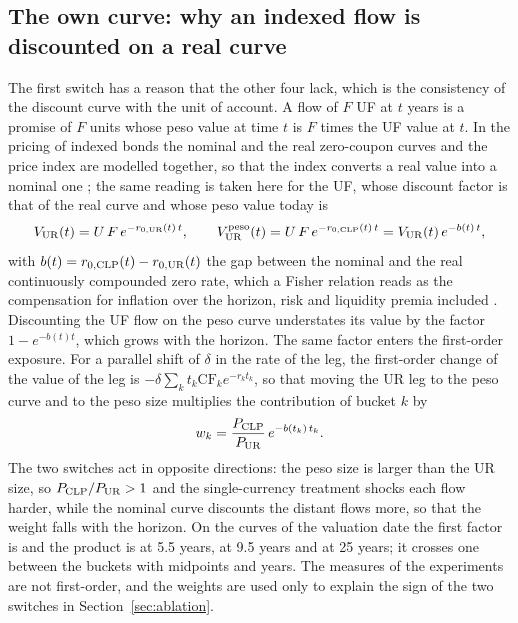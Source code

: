 \subsection{The own curve: why an indexed flow is discounted on a real curve}
\label{sec:method-curve}

The first switch has a reason that the other four lack, which is the consistency of the discount curve with the unit of account. A flow of $F$ UF at $t$ years is a promise of $F$ units whose peso value at time $t$ is $F$ times the UF value at $t$. In the pricing of indexed bonds the nominal and the real zero-coupon curves and the price index are modelled together, so that the index converts a real value into a nominal one \citep{Jarrow2003}; the same reading is taken here for the UF, whose discount factor is that of the real curve and whose peso value today is
\begin{equation}
V_{\mathrm{UR}}(t)=U\,F\,e^{-r_{0,\mathrm{UR}}(t)\,t},\qquad V_{\mathrm{UR}}^{\mathrm{peso}}(t)=U\,F\,e^{-r_{0,\mathrm{CLP}}(t)\,t}=V_{\mathrm{UR}}(t)\,e^{-b(t)\,t},
\label{eq:fisher}
\end{equation}
with $b(t)=r_{0,\mathrm{CLP}}(t)-r_{0,\mathrm{UR}}(t)$ the gap between the nominal and the real continuously compounded zero rate, which a Fisher relation reads as the compensation for inflation over the horizon, risk and liquidity premia included \citep{Gurkaynak2010,Ang2008}. Discounting the UF flow on the peso curve understates its value by the factor $1-e^{-b(t)t}$, which grows with the horizon. The same factor enters the first-order exposure. For a parallel shift of $\delta$ in the rate of the leg, the first-order change of the value of the leg is $-\delta\sum_k t_k\mathrm{CF}_k e^{-r_k t_k}$, so that moving the UR leg to the peso curve and to the peso size multiplies the contribution of bucket $k$ by
\begin{equation}
w_k=\frac{P_{\mathrm{CLP}}}{P_{\mathrm{UR}}}\,e^{-b(t_k)\,t_k}.
\label{eq:weight}
\end{equation}
The two switches act in opposite directions: the peso size is larger than the UR size, so $P_{\mathrm{CLP}}/P_{\mathrm{UR}}>1$ and the single-currency treatment shocks each flow harder, while the nominal curve discounts the distant flows more, so that the weight falls with the horizon. On the curves of the valuation date the first factor is \sizeRatio{} and the product is \weightFive{} at 5.5 years, \weightTen{} at 9.5 years and \weightLast{} at 25 years; it crosses one between the buckets with midpoints \tStarLo{} and \tStarHi{} years. The measures of the experiments are not first-order, and the weights are used only to explain the sign of the two switches in Section~\ref{sec:ablation}.

